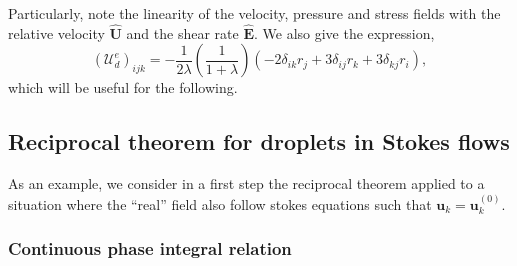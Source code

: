 Particularly, note the linearity of the velocity, pressure and stress fields with the relative velocity $\hat{\textbf{U}}$ and the shear rate $\hat{\textbf{E}}$. 
We also give the expression, 
\begin{equation*}
    (\mathcal{U}_d^e)_{ijk} 
    = 
    - \frac{1}{2\lambda}\left(\frac{1}{1+\lambda}\right)(-2 \delta_{ik} r_j + 3\delta_{ij} r_k + 3\delta_{kj} r_i) ,
\end{equation*}
which will be useful for the following. 


\subsection{Reciprocal theorem for droplets in Stokes flows}

As an example, we consider in a first step the reciprocal theorem applied to a situation where the ``real'' field also follow stokes equations such that $\textbf{u}_k =\textbf{u}_k^{(0)}$. 

\subsubsection{Continuous phase integral relation}

